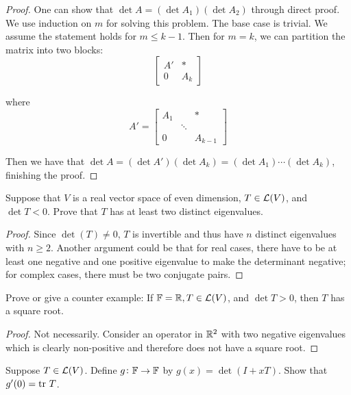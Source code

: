 \documentclass{extarticle}
\begin{document}
\begin{proof}
One can show that \(\det A = (\det A_1) (\det A_2)\) through direct proof. We use induction on \(m\) for 
solving this problem. The base case is trivial. We assume the statement holds for \(m \leq k-1\). Then 
for \(m = k\), we can partition the matrix into two blocks: 
\[\begin{bmatrix}
    A' & * \\ 
    0 & A_k 
\end{bmatrix}\]

where 
\[A' = \begin{bmatrix}
    A_1 & & * \\ 
    & \ddots & \\ 
    0 & & A_{k-1}
\end{bmatrix}\]

Then we have that \(\det A = (\det A') (\det A_k) = (\det A_1) \cdots (\det A_k)\), finishing the proof. 
\end{proof}





\begin{problem}{9}
    Suppose that \(V\) is a real vector space of even dimension, \(T \in \mathcal{L}(V)\), and \(\det T < 0\). 
    Prove that \(T\) has at least two distinct eigenvalues. 
\end{problem}

\begin{proof}
Since \(\det (T) \neq 0\), \(T\) is invertible and thus have \(n\) distinct eigenvalues with 
\(n \geq 2\). Another argument could be that for real cases, there have to be at least one negative and 
one positive eigenvalue to make the determinant negative; for complex cases, there must be 
two conjugate pairs. 
\end{proof}


\begin{problem}{11}
    Prove or give a counter example: If \(\mathbb{F} = \mathbb{R}, T \in \mathcal{L}(V)\), and \(\det T > 0\), then 
    \(T\) has a square root. 
\end{problem}

\begin{proof}
Not necessarily. Consider an operator in \(\mathbb{R}^2\) with two negative eigenvalues which is clearly 
non-positive and therefore does not have a square root. 
\end{proof}


\begin{problem}{16}
    Suppose \(T \in \mathcal{L}(V)\). Define \(g \colon \mathbb{F} \to \mathbb{F}\) by \(g(x) = \det (I + xT)\). Show 
    that \(g'(0) = \text{tr} \ T\). 
\end{problem}
\end{document}

